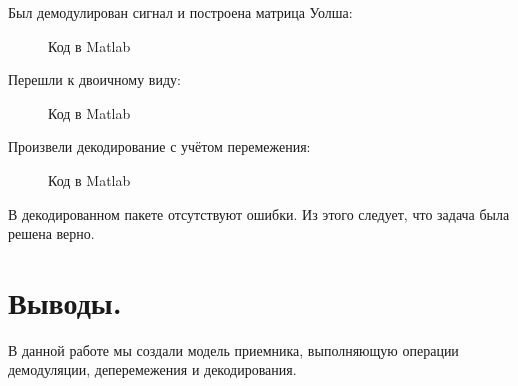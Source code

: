 \documentclass[a4paper,14pt]{extarticle}
\begin{document}
Был демодулирован сигнал и построена матрица Уолша:

\begin{figure}[H]
\caption{Код в Matlab}
\label{5}
\end{figure}

Перешли к двоичному виду:

\begin{figure}[H]
\caption{Код в Matlab}
\label{6}
\end{figure}

Произвели декодирование с учётом перемежения:

\begin{figure}[H]
\caption{Код в Matlab}
\label{7}
\end{figure}

В декодированном пакете отсутствуют ошибки. Из этого следует, что задача была решена верно.


\section{Выводы.}

В данной работе мы создали модель приемника, выполняющую операции демодуляции, деперемежения и декодирования.
\end{document}
